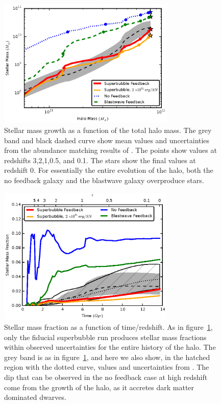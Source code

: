 \begin{figure}
    \includegraphics[width=0.75\textwidth]{figures2/mass_growth.eps}
    \caption[Stellar mass growth for different feedback models]{Stellar mass
    growth as a function of the total halo mass.  The grey band and black dashed
    curve show mean values and uncertainties from the abundance matching results
    of \citet{Behroozi2013}.  The points show values at redshifts 3,2,1,0.5, and
    0.1.  The stars show the final values at redshift 0.  For essentially the
    entire evolution of the halo, both the no feedback galaxy and the blastwave
    galaxy overproduce stars.}
    \label{mass_growth2}
\end{figure}
\begin{figure}
    \includegraphics[width=0.75\textwidth]{figures2/stellar_fraction.eps}
    \caption[Stellar mass fraction evolution]{Stellar mass fraction as a
    function of time/redshift.  As in figure~\ref{mass_growth2}, only the
    fiducial superbubble run produces stellar mass fractions within observed
    uncertainties for the entire history of the halo. The grey band is as in
    figure~\ref{mass_growth2}, and here we also show, in the hatched region with
    the dotted curve, values and uncertainties from \citet{Moster2013}.  The dip
    that can be observed in the no feedback case at high redshift come from the
    growth of the halo, as it accretes dark matter dominated dwarves.}
    \label{stellar_fraction2}
\end{figure}
